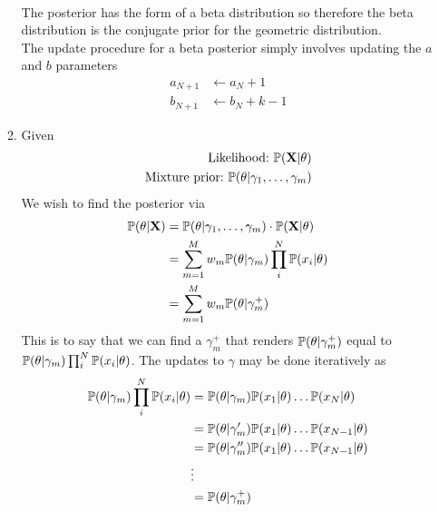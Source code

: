 \documentclass{article}
\begin{document}
\begin{enumerate}
\begin{enumerate}
\begin{align*}
                \end{align*}
                The posterior has the form of a beta distribution so
                therefore the beta distribution is the conjugate prior for
                the geometric distribution. \\
                The update procedure for a beta posterior simply involves
                updating the \(a\) and \(b\) parameters
                \begin{align*}
                    a_{N+1} &\leftarrow a_N + 1 \\
                    b_{N+1} &\leftarrow b_N + k - 1
                \end{align*}
            \item %
              Given
              \begin{align*}
                \textnormal{Likelihood:\ } \mathbb{P}(\mathbf{X}|\theta) \\
                \textnormal{Mixture prior:\ } \mathbb{P}(\theta|\gamma_1,\hdots,\gamma_m)
              \end{align*}
              We wish to find the posterior via
              \begin{align*}
                \mathbb{P}(\theta|\mathbf{X}) &= \mathbb{P}(\theta|\gamma_1,\hdots,\gamma_m)
                \cdot \mathbb{P}(\mathbf{X}|\theta) \\
                &=  \sum^M_{m=1}w_m\mathbb{P}(\theta|\gamma_m)\prod_i^N\mathbb{P}(x_i|\theta) \\
                &=  \sum^M_{m=1}w_m\mathbb{P}(\theta|\gamma_m^+) \\
              \end{align*}
              This is to say that we can find a \(\gamma_m^+\) that renders
              \(\mathbb{P}(\theta|\gamma_m^+)\) equal to
              \(\mathbb{P}(\theta|\gamma_m)\prod_i^N\mathbb{P}(x_i|\theta)\). The updates to
              \(\gamma\) may be done iteratively as
              \begin{align*}
                \pr(\theta|\gamma_m)\prod_i^N\pr(x_i|\theta)
                &=  \pr(\theta|\gamma_m)\pr(x_1|\theta)\hdots\pr(x_N|\theta) \\
                &=  \pr(\theta|\gamma_m^\prime)\pr(x_1|\theta)\hdots\pr(x_{N-1}|\theta) \\
                &=  \pr(\theta|\gamma_m^{\prime\prime})\pr(x_1|\theta)\hdots\pr(x_{N-1}|\theta) \\
                &\vdots \\
                &= \pr(\theta|\gamma_m^+) \\

\end{align*}
\end{enumerate}
\end{enumerate}
\end{document}
